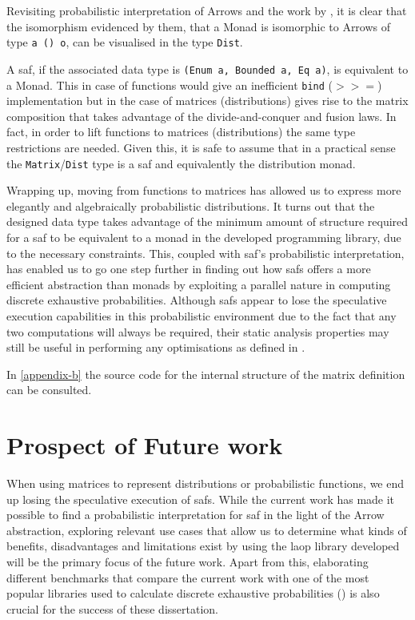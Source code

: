 \documentclass[
  oneside,
  11pt, a4paper,
  footinclude=true,
  headinclude=true,
  cleardoublepage=empty
]{scrbook}
\theoremstyle{definition}
\theoremstyle{definition}
\begin{document}
        Revisiting probabilistic interpretation of Arrows and the work by \cite{Lindley:2011:IOA:1953652.1954016}, it is clear that the isomorphism evidenced by them, that a Monad is isomorphic to Arrows of type \texttt{a () o}, can be visualised in the type \texttt{Dist}.
        
        A \gls{saf}, if the associated data type is \texttt{(Enum a, Bounded a, Eq a)}, is equivalent to a Monad. This in case of functions would give an inefficient \texttt{bind} ($>>=$) implementation but in the case of matrices (distributions) gives rise to the matrix composition that takes advantage of the divide-and-conquer and fusion laws. In fact, in order to lift functions to matrices (distributions) the same type restrictions are needed. Given this, it is safe to assume that in a practical sense the \texttt{Matrix}/\texttt{Dist} type is a \gls{saf} and equivalently the distribution monad.
        
        Wrapping up, moving from functions to matrices has allowed us to express more elegantly and algebraically probabilistic distributions. It turns out that the designed data type takes advantage of the minimum amount of structure required for a \gls{saf} to be equivalent to a monad in the developed programming library, due to the necessary constraints. This, coupled with \gls{saf}'s probabilistic interpretation, has enabled us to go one step further in finding out how \glspl{saf} offers a more efficient abstraction than monads by exploiting a parallel nature in computing discrete exhaustive probabilities. Although \glspl{saf} appear to lose the speculative execution capabilities in this probabilistic environment due to the fact that any two computations will always be required, their static analysis properties may still be useful in performing any optimisations as defined in \cite{bernstein2019static}.  
        
        In \ref{appendix-b} the source code for the internal structure of the matrix definition can be consulted.
        
	\chapter{Prospect of Future work}\label{ch-conclusion}
	
	 When using matrices to represent distributions or probabilistic functions, we end up losing the speculative execution of \glspl{saf}. While the current work has made it possible to find a probabilistic interpretation for \gls{saf} in the light of the Arrow abstraction, exploring relevant use cases that allow us to determine what kinds of benefits, disadvantages and limitations exist by using the \gls{laop} library developed will be the primary focus of the future work. Apart from this, elaborating different benchmarks that compare the current work with one of the most popular libraries used to calculate discrete exhaustive probabilities (\cite{erwig_kollmansberger_2006}) is also crucial for the success of these dissertation.
	 
\end{document}
